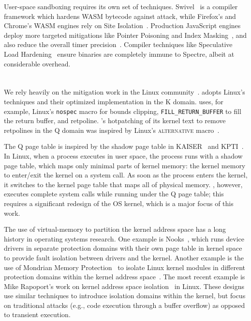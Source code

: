 User-space sandboxing requires its own set of techniques.
Swivel~\cite{narayan:swivel} is a compiler framework which hardens WASM bytecode against attack, while
Firefox's and Chrome's WASM engines rely on Site Isolation~\cite{reis:site-isolation}.
Production JavaScript engines deploy more targeted mitigations like Pointer Poisoning and Index Masking~\cite{webkit:spectre-meltdown}, and also reduce the overall timer precision~\cite{mozilla:timer-precision, webkit:spectre-meltdown}.
Compiler techniques like Speculative Load Hardening~\cite{carruth:slh} ensure binaries are completely immune to Spectre, albeit at considerable overhead.

\section{\sys}

We rely heavily on the mitigation work in the Linux
community~\cite{linux:vuln}. \sys adopts Linux's techniques and their
optimized implementation in the K domain.  \sys uses, for example,
Linux's \texttt{nospec} macro for bounds clipping,
\texttt{FILL\_RETURN\_BUFFER} to fill the return buffer, and retpoline.
\sys's hotpatching of its kernel text to remove retpolines in the Q
domain was inspired by Linux's \textsc{alternative}
macro~\cite{lwn:alternative}.


The Q page table is inspired by the shadow page table in
KAISER~\cite{gruss:kaiser} and KPTI~\cite{linux:kpti}. In Linux, when
a process executes in user space, the process runs with a shadow
page table, which maps only minimal parts of kernel memory: the kernel
memory to enter/exit the kernel on a system call. As soon as the process
enters the kernel, it switches to the kernel page table that maps all
of physical memory.  \sys, however, executes complete system
calls while running under the Q page table; this requires a significant
redesign of the OS kernel, which is a major focus of this work.

The use of virtual-memory to partition the kernel address space has a
long history in operating systems research.  One example is
Nooks~\cite{swift:nooks-tocs}, which runs device drivers in separate
protection domains with their own page table in kernel space to
provide fault isolation between drivers and the kernel.  Another
example is the use of Mondrian Memory Protection~\cite{witchel:mmp} to
isolate Linux kernel modules in different protection domains within
the kernel address space~\cite{witchel:mondrix}.  The most
recent example is Mike Rapoport's work on kernel address space
isolation~\cite{lwn:beyond-kpti} in Linux.  These designs use similar
techniques to introduce isolation domains within the kernel, but focus
on traditional attacks (e.g., code execution through a buffer overflow)
as opposed to transient execution.

